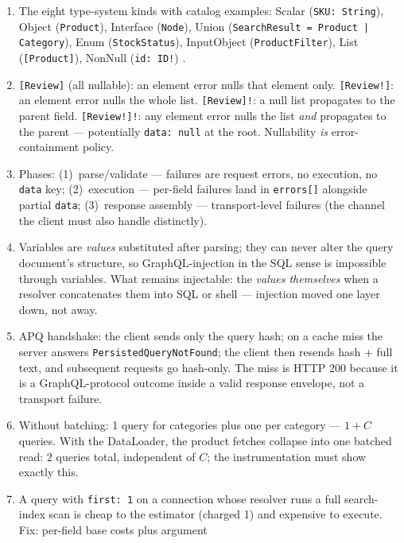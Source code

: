 \begin{enumerate}[leftmargin=2.2em]
  \item The eight type-system kinds with catalog examples: Scalar
    (\texttt{SKU: String}), Object (\texttt{Product}), Interface
    (\texttt{Node}), Union (\texttt{SearchResult = Product | Category}),
    Enum (\texttt{StockStatus}), InputObject (\texttt{ProductFilter}),
    List (\texttt{[Product]}), NonNull (\texttt{id: ID!})
    \cite{graphqlspec}.
  \item \texttt{[Review]} (all nullable): an element error nulls that
    element only. \texttt{[Review!]}: an element error nulls the whole
    list. \texttt{[Review]!}: a null list propagates to the parent field.
    \texttt{[Review!]!}: any element error nulls the list \emph{and}
    propagates to the parent --- potentially \texttt{data: null} at the
    root. Nullability \emph{is} error-containment policy.
  \item Phases: (1)~parse/validate --- failures are request errors, no
    execution, no \texttt{data} key; (2)~execution --- per-field failures
    land in \texttt{errors[]} alongside partial \texttt{data};
    (3)~response assembly --- transport-level failures (the channel the
    client must also handle distinctly).
  \item Variables are \emph{values} substituted after parsing; they can
    never alter the query document's structure, so GraphQL-injection in the
    SQL sense is impossible through variables. What remains injectable: the
    \emph{values themselves} when a resolver concatenates them into SQL or
    shell --- injection moved one layer down, not away.
  \item APQ handshake: the client sends only the query hash; on a cache miss
    the server answers \texttt{PersistedQueryNotFound}; the client then
    resends hash + full text, and subsequent requests go hash-only. The
    miss is HTTP 200 because it is a GraphQL-protocol outcome inside a
    valid response envelope, not a transport failure.
  \item Without batching: 1 query for categories plus one per category ---
    $1 + C$ queries. With the DataLoader, the product fetches collapse into
    one batched read: 2 queries total, independent of $C$; the
    instrumentation must show exactly this.
  \item A query with \texttt{first: 1} on a connection whose resolver runs
    a full search-index scan is cheap to the estimator (charged 1) and
    expensive to execute. Fix: per-field base costs plus argument

\end{enumerate}
